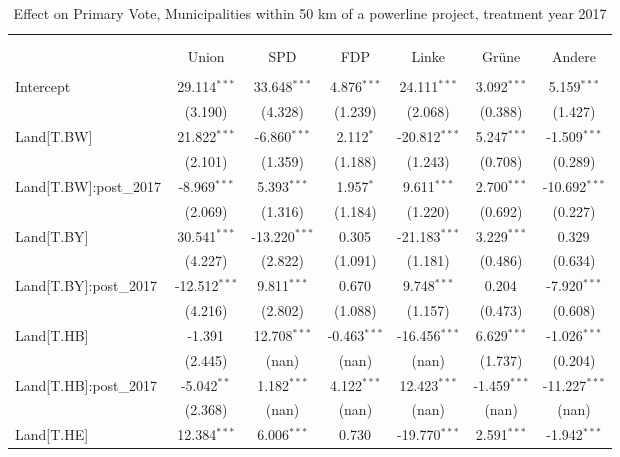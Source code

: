 \begin{table}[!htbp] \centering
  \caption{Effect on Primary Vote, Municipalities within 50 km of a powerline project, treatment year 2017}
\begin{tabular}{@{\extracolsep{5pt}}lcccccc}
\\[-1.8ex]\hline
\hline \\[-1.8ex]
\\[-1.8ex] & \multicolumn{1}{c}{Union} & \multicolumn{1}{c}{SPD} & \multicolumn{1}{c}{FDP} & \multicolumn{1}{c}{Linke} & \multicolumn{1}{c}{Grüne} & \multicolumn{1}{c}{Andere}  \\
\hline \\[-1.8ex]
 Intercept & 29.114$^{***}$ & 33.648$^{***}$ & 4.876$^{***}$ & 24.111$^{***}$ & 3.092$^{***}$ & 5.159$^{***}$ \\
  & (3.190) & (4.328) & (1.239) & (2.068) & (0.388) & (1.427) \\
 Land[T.BW] & 21.822$^{***}$ & -6.860$^{***}$ & 2.112$^{*}$ & -20.812$^{***}$ & 5.247$^{***}$ & -1.509$^{***}$ \\
  & (2.101) & (1.359) & (1.188) & (1.243) & (0.708) & (0.289) \\
 Land[T.BW]:post_2017 & -8.969$^{***}$ & 5.393$^{***}$ & 1.957$^{*}$ & 9.611$^{***}$ & 2.700$^{***}$ & -10.692$^{***}$ \\
  & (2.069) & (1.316) & (1.184) & (1.220) & (0.692) & (0.227) \\
 Land[T.BY] & 30.541$^{***}$ & -13.220$^{***}$ & 0.305$^{}$ & -21.183$^{***}$ & 3.229$^{***}$ & 0.329$^{}$ \\
  & (4.227) & (2.822) & (1.091) & (1.181) & (0.486) & (0.634) \\
 Land[T.BY]:post_2017 & -12.512$^{***}$ & 9.811$^{***}$ & 0.670$^{}$ & 9.748$^{***}$ & 0.204$^{}$ & -7.920$^{***}$ \\
  & (4.216) & (2.802) & (1.088) & (1.157) & (0.473) & (0.608) \\
 Land[T.HB] & -1.391$^{}$ & 12.708$^{***}$ & -0.463$^{***}$ & -16.456$^{***}$ & 6.629$^{***}$ & -1.026$^{***}$ \\
  & (2.445) & (nan) & (nan) & (nan) & (1.737) & (0.204) \\
 Land[T.HB]:post_2017 & -5.042$^{**}$ & 1.182$^{***}$ & 4.122$^{***}$ & 12.423$^{***}$ & -1.459$^{***}$ & -11.227$^{***}$ \\
  & (2.368) & (nan) & (nan) & (nan) & (nan) & (nan) \\
 Land[T.HE] & 12.384$^{***}$ & 6.006$^{***}$ & 0.730$^{}$ & -19.770$^{***}$ & 2.591$^{***}$ & -1.942$^{***}$ \\

\end{tabular}
\end{table}

